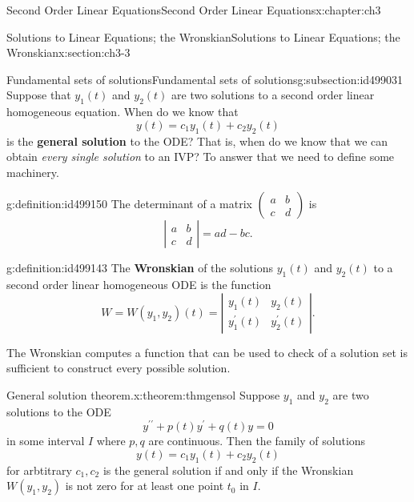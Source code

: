 \documentclass[oneside,10pt,]{book}
\newcommand{\terminology}[1]{\textbf{#1}}
\numberwithin{equation}{section}
\numberwithin{equation}{section}
\newcommand{\amp}{&}
\begin{document}
\begin{chapterptx}{Second Order Linear Equations}{}{Second Order Linear Equations}{}{}{x:chapter:ch3}
\begin{sectionptx}{Solutions to Linear Equations; the Wronskian}{}{Solutions to Linear Equations; the Wronskian}{}{}{x:section:ch3-3}
\begin{subsectionptx}{Fundamental sets of solutions}{}{Fundamental sets of solutions}{}{}{g:subsection:id499031}
Suppose that \(y_{1}(t)\) and \(y_{2}(t)\) are two solutions to a second order linear homogeneous equation. When do we know that%
\begin{equation*}
y(t)=c_{1}y_{1}(t)+c_{2}y_{2}(t)
\end{equation*}
is the \terminology{general solution} to the ODE? That is, when do we know that we can obtain \emph{every single solution} to an IVP? To answer that we need to define some machinery.%
\begin{definition}{}{g:definition:id499150}%
The determinant of a matrix \(\left(\begin{array}{cc}
a \amp b\\
c \amp d
\end{array}\right)\) is%
\begin{equation*}
\left|\begin{array}{cc}
a \amp b\\
c \amp d
\end{array}\right|=ad-bc.
\end{equation*}
\end{definition}
\begin{definition}{}{g:definition:id499143}%
The \terminology{Wronskian} of the solutions \(y_{1}(t)\) and \(y_{2}(t)\) to a second order linear homogeneous ODE is the function%
\begin{equation*}
W=W(y_{1},y_{2})(t)=\left|\begin{array}{cc}
y_{1}(t) \amp y_{2}(t)\\
y_{1}^{\prime}(t) \amp y_{2}^{\prime}(t)
\end{array}\right|.
\end{equation*}
\end{definition}
The Wronskian computes a function that can be used to check of a solution set is sufficient to construct every possible solution.%
\begin{theorem}{General solution theorem.}{}{x:theorem:thmgensol}%
Suppose \(y_{1}\) and \(y_{2}\) are two solutions to the ODE%
\begin{equation*}
y^{\prime\prime}+p(t)y^{\prime}+q(t)y=0
\end{equation*}
in some interval \(I\) where \(p,q\) are continuous. Then the family of solutions%
\begin{equation*}
y(t)=c_{1}y_{1}(t)+c_{2}y_{2}(t)
\end{equation*}
for arbtitrary \(c_{1},c_{2}\) is the general solution if and only if the Wronskian \(W\left(y_{1},y_{2}\right)\) is not zero for at least one point \(t_{0}\) in \(I\).%

\end{theorem}
\end{subsectionptx}
\end{sectionptx}
\end{chapterptx}
\end{document}
